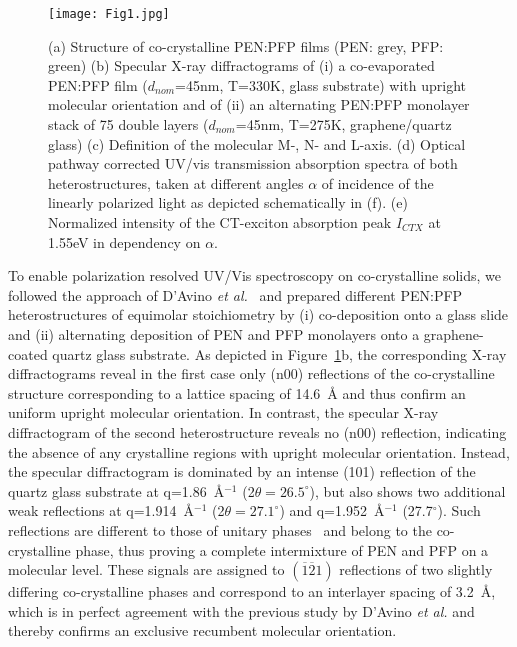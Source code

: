 \documentclass[journal=jpclcd,manuscript=letter]{achemso}
\begin{document}
\begin{figure}
	\centering
	\texttt{[image: Fig1.jpg]}
	\caption{ (a) Structure of co-crystalline PEN:PFP films (PEN: grey, PFP: green) (b) Specular X-ray diffractograms of (i) a co-evaporated PEN:PFP film ($d_{nom}$=45nm, T=330K, glass substrate) with upright molecular orientation and of (ii) an alternating PEN:PFP monolayer stack of 75 double layers ($d_{nom}$=45nm, T=275K, graphene/quartz glass) (c) Definition of the molecular M-, N- and L-axis.  (d) Optical pathway corrected UV/vis transmission absorption spectra of both heterostructures, taken at different angles $\alpha$ of incidence of the linearly polarized light as depicted schematically in (f). (e) Normalized intensity of the CT-exciton absorption peak $I_{CTX}$ at 1.55eV in dependency on $\alpha$.}
	\label{Figure:fig1}
\end{figure}

To enable polarization resolved UV/Vis spectroscopy on co-crystalline solids, we followed the approach of D’Avino \textit{et al.}~\cite{davi+20cm} and prepared different PEN:PFP heterostructures of equimolar stoichiometry by (i) co-deposition onto a glass slide and (ii) alternating deposition of PEN and PFP monolayers onto a graphene-coated quartz glass substrate. 
As depicted in Figure~\ref{Figure:fig1}b, the corresponding X-ray diffractograms reveal in the first case only (n00) reflections of the co-crystalline structure corresponding to a lattice spacing of 14.6~\AA{} and thus confirm an uniform upright molecular orientation. In contrast, the specular X-ray diffractogram of the second heterostructure reveals no (n00) reflection, indicating the absence of any crystalline regions with upright molecular orientation. Instead, the specular diffractogram is dominated by an intense (101) reflection of the quartz glass substrate at q=1.86~\AA{}$^{-1}$ (2$\theta=26.5^{\circ}$), but also shows two additional weak reflections at q=1.914~\AA{}$^{-1}$ (2$\theta=27.1^{\circ}$) and q=1.952~\AA{}$^{-1}$ (27.7$^{\circ}$). 
Such reflections are different to those of unitary phases~\cite{salz+12acsn,breu-witt15acsami,gund+20ami} and belong to the co-crystalline phase, thus proving a complete intermixture of PEN and PFP on a molecular level.
These signals are assigned to $\mathrm{(\overline{1}\overline{2}1)}$ reflections of two slightly differing co-crystalline phases and correspond to an interlayer spacing of 3.2~\AA{}, which is in perfect agreement with the previous study by D’Avino \textit{et al.} and thereby confirms an exclusive recumbent molecular orientation.  
\end{document}
